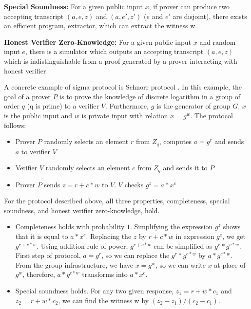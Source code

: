 {      \textbf{Special Soundness:} For a given public input $x$, if prover can produce two accepting transcript $(a, e, z)$ 
      and $(a, e', z')$ ($e$ and $e'$ are disjoint),  there exists an efficient program, extractor, which can extract the 
      witness w.
      
      \textbf{Honest Verifier Zero-Knowledge:} For a given public input $x$ and random input $e$, there is a simulator 
      which outputs an accepting transcript $(a, e, z)$ which is indistinguishable from a proof generated by 
      a prover interacting with honest verifier. 
     
     A concrete example of sigma protocol \citep{10.1007/3-540-48658-5_19} is Schnorr protocol \citep{10.1007/0-387-34805-0_22}.  In this example, 
     the goal of a prover $P$ is
     to prove the knowledge of discrete logarithm in a group of order $q$ (q is prime) to a verifier $V$.
     Furthermore, $g$ is the generator of 
     group $G$, $x$ is the public input and $w$ is private input with relation $x = g^w$. The protocol follows:
     
     \begin{itemize}
     \item Prover $P$ randomly selects an element $r$ from $Z_{q}$, computes $a = g^r$ and sends $a$ to verifier $V$
     \item Verifier $V$ randomly selects an element $c$ from  $Z_{q}$ and sends it to $P$
     \item Prover $P$ sends $z = r + c * w $ to $V$.  $V$ checks $g^{z} = a * x^{c}$
     \end{itemize}
     
     For the protocol described above, all three properties, completeness, special soundness, and honest 
     verifier zero-knowledge, hold. 
     \begin{itemize}
      \item Completeness holds with probability $1$. Simplifying the expression $g^{z}$ shows that 
      it is equal to $a * x^{c}$. Replacing the $z$ by $r + c * w$ in expression  $g^{z}$, we get 
      $g^{r + c * w}$.  Using addition rule of power, $g^{r + c * w}$ can be simplified as 
      $g^{r} * g^{c * w}$. First step of protocol, $a = g^r$, so we can replace the $g^{r} * g^{c * w}$ 
      by $a * g^{c * w}$. From the group infrastructure, we have $x = g^w$, so we can write $x$ at place of 
      $g^{w}$, therefore, $a * g^{c * w}$ transforms into $a * x^c$. 
      
     \item Special soundness holds. For any two given response, 
     $z_{1} = r + w * c_{1}$ and  $z_{2} = r + w * c_{2}$, we can find the witness w by  $(z_{2} - z_{1})/(c_{2} - c_{1})$.
     

\end{itemize}}
